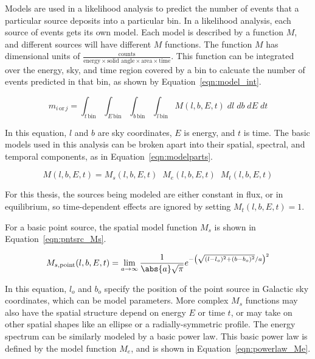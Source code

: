   Models are used in a likelihood analysis to predict the number of events that a particular source deposits into a particular bin.
  In a likelihood analysis, each source of events gets its own model.
  Each model is described by a function $M$, and different sources will have different $M$ functions.
  The function $M$ has dimensional units of $\frac{\textrm{counts}}{\textrm{energy}\times\textrm{solid angle}\times\textrm{area}\times\textrm{time}}$.
  This function can be integrated over the energy, sky, and time region covered by a bin to calcuate the number of events predicted in that bin, as shown by Equation~\ref{eqn:model_int}.
  
  \begin{equation}\label{eqn:model_int}
    m_{i \, \textrm{or} \, j} = \int_{t\,\textrm{bin}} \int_{E\,\textrm{bin}} \int_{b\,\textrm{bin}} \int_{l\,\textrm{bin}} M(l,b,E,t)\; dl \; db \; dE \; dt
  \end{equation}
  
  In this equation, $l$ and $b$ are sky coordinates, $E$ is energy, and $t$ is time.
  The basic models used in this analysis can be broken apart into their spatial, spectral, and temporal components, as in Equation~\ref{eqn:modelparts}.

  \begin{equation}\label{eqn:modelparts}
    M(l,b,E,t) = M_s(l,b,E,t) \; \; M_e(l,b,E,t) \; \; M_t(l,b,E,t)
  \end{equation}
  
  For this thesis, the sources being modeled are either constant in flux, or in equilibrium, so time-dependent effects are ignored by setting $M_{t}(l,b,E,t) = 1$.

  For a basic point source, the spatial model function $M_s$ is shown in Equation~\ref{eqn:pntsrc_Ms}.

  \begin{equation}\label{eqn:pntsrc_Ms}
    M_{s,\textrm{point}}(l,b,E,t) = \lim_{a\to\infty} \frac{1}{ \abs{a} \sqrt{\pi} } e^{ - \left ( \sqrt{ (l-l_o)^2 + (b-b_o)^2 }/a \right )^2 }
  \end{equation}
  
  In this equation, $l_o$ and $b_o$ specify the position of the point source in Galactic sky coordinates, which can be model parameters.
  More complex $M_s$ functions may also have the spatial structure depend on energy $E$ or time $t$, or may take on other spatial shapes like an ellipse or a radially-symmetric profile.
  The energy spectrum can be similarly modeled by a basic power law.
  This basic power law is defined by the model function $M_e$, and is shown in Equation~\ref{eqn:powerlaw_Me}.
  
